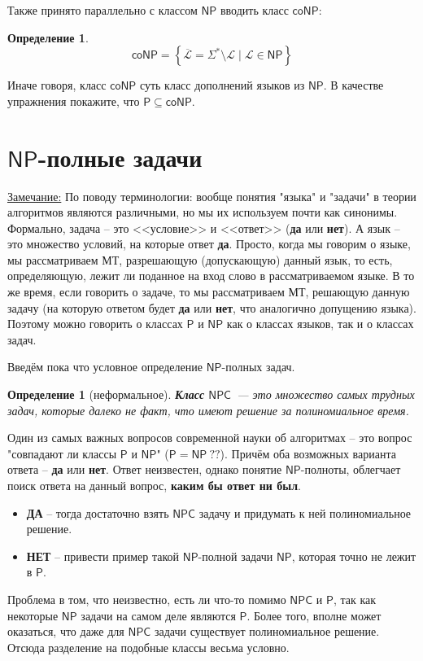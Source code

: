\documentclass[a4paper,12pt]{article}
\newtheorem{definition}{Определение}
\newtheorem*{defin}{Определение}
\newcommand{\Pclass}{\mathsf{P}}
\newcommand{\NPclass}{\mathsf{NP}}
\newcommand{\coNPclass}{\mathsf{coNP}}
\newcommand{\NPCclass}{\mathsf{NPC}}
\newcommand{\note}{\underline{Замечание:} }
\begin{document}
    Также принято параллельно с классом \(\NPclass\) вводить класс \(\coNPclass\):
    \begin{definition}
        \[\coNPclass = \left\{\overline{\mathscr{L}} = \Sigma^* \setminus \mathscr{L} \mid \mathscr{L} \in \NPclass \right\}\]
    \end{definition}
    Иначе говоря, класс \(\coNPclass\) суть класс дополнений языков из \(\NPclass\).
    В качестве упражнения покажите, что \(\Pclass \subseteq \coNPclass\).
\newpage
\section{\(\NPclass\)-полные задачи}

\note{По поводу терминологии: вообще понятия "языка" и "задачи" в теории алгоритмов являются различными, но мы их используем почти как синонимы. Формально, задача -- это <<условие>> и <<ответ>> (\textbf{да} или \textbf{нет}). А язык -- это множество условий, на которые ответ \textbf{да}. Просто, когда мы говорим о языке, мы рассматриваем МТ, разрешающую (допускающую) данный язык, то есть, определяющую, лежит ли поданное на вход слово в рассматриваемом языке. В то же время, если говорить о задаче, то мы рассматриваем МТ, решающую данную задачу (на которую ответом будет \textbf{да} или \textbf{нет}, что аналогично допущению языка). Поэтому можно говорить о классах $\Pclass$ и $\NPclass$ как о классах языков, так и о классах задач.}

Введём пока что условное определение $\NPclass$-полных задач.

\begin{defin}[неформальное]
    \textbf{Класс} \(\NPCclass\)~--- это множество самых трудных задач, которые далеко не факт, что имеют решение за полиномиальное время.
\end{defin}
Один из самых важных вопросов современной науки об алгоритмах -- это вопрос "совпадают ли классы $\Pclass$ и $\NPclass$" ($\Pclass = \NPclass\ ??$). Причём оба возможных варианта ответа -- \textbf{да} или \textbf{нет}. Ответ неизвестен, однако понятие $\NPclass$-полноты, облегчает поиск ответа на данный вопрос, \textbf{каким бы ответ ни был}.
\begin{itemize}
    \item \textbf{ДА} -- тогда достаточно взять $\NPCclass$ задачу и придумать к ней полиномиальное решение.
    \item \textbf{НЕТ} -- привести пример такой $\NPclass$-полной задачи $\NPclass$, которая точно не лежит в $\Pclass$.
\end{itemize}
Проблема в том, что неизвестно, есть ли что-то помимо $\NPCclass$ и $\Pclass$, так как некоторые $\NPclass$ задачи на самом деле являются $\Pclass$. Более того, вполне может оказаться, что даже для $\NPCclass$ задачи существует полиномиальное решение. Отсюда разделение на подобные классы весьма условно.
\end{document}
